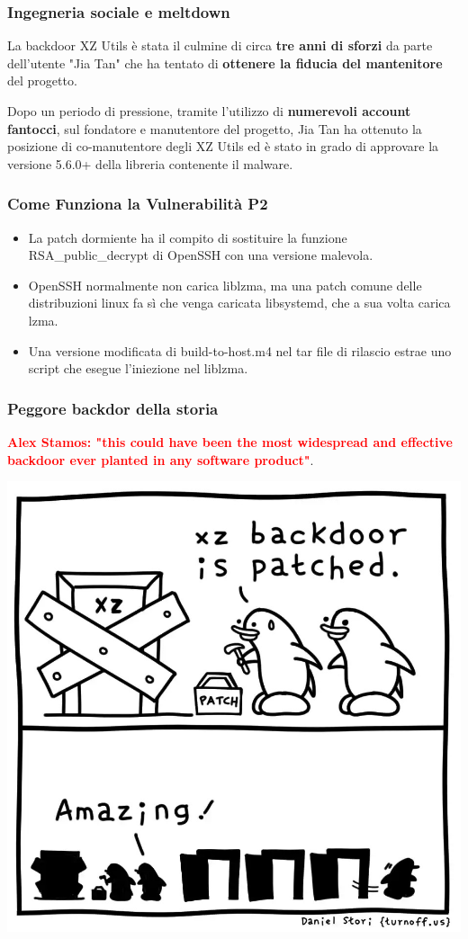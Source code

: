 \begin{frame}
\frametitle{Ingegneria sociale e meltdown}
La backdoor XZ Utils è stata il culmine di circa \textbf{tre anni di sforzi} da parte dell'utente "Jia Tan" che ha tentato di \textbf{ottenere la fiducia del mantenitore} del progetto.

\vspace{0.5 cm}

Dopo un periodo di pressione, tramite l'utilizzo di \textbf{numerevoli account fantocci}, sul fondatore e manutentore del progetto, Jia Tan ha ottenuto la posizione di co-manutentore degli XZ Utils ed è stato in grado di approvare la versione 5.6.0+ della libreria contenente il malware.

\end{frame}

\begin{frame}
    \frametitle{Come Funziona la Vulnerabilità P2}
    \begin{itemize}
        \item La patch dormiente ha il compito di sostituire la funzione RSA\_public\_decrypt di OpenSSH con una versione malevola.
        \item OpenSSH normalmente non carica liblzma, ma una patch comune delle distribuzioni linux  fa sì che venga caricata libsystemd, che a sua volta carica lzma.
        \item Una versione modificata di build-to-host.m4 nel tar file di rilascio estrae uno script che esegue l'iniezione nel liblzma.
    \end{itemize}
\end{frame}

\begin{frame}
    \frametitle{Peggore backdor della storia}
    \textbf{\textcolor{red}{Alex Stamos: "this could have been the most widespread and effective backdoor ever planted in any software product"}}.

    \begin{center}
        \includegraphics[width=0.4\linewidth]{img/2-Introduction/xz-backdoor-patched.jpeg}
    \end{center}
\vspace{0.5 cm}

\end{frame}